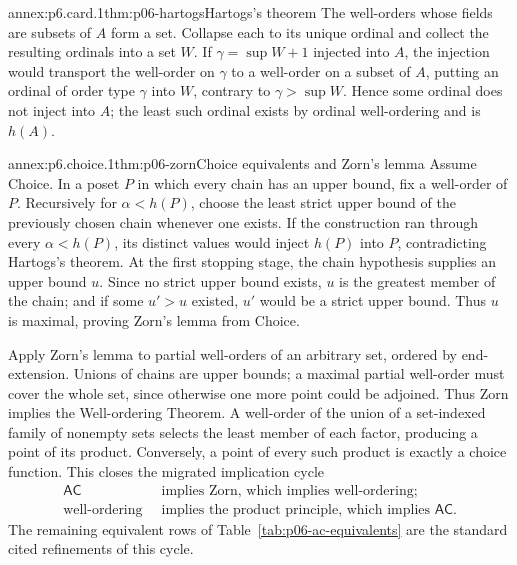 
\begin{annexitem}{annex:p6.card.1}{thm:p06-hartogs}{Hartogs's theorem}
The well-orders whose fields are subsets of \(A\) form a set.  Collapse each
to its unique ordinal and collect the resulting ordinals into a set \(W\).
If \(\gamma=\sup W+1\) injected into \(A\), the injection would transport the
well-order on \(\gamma\) to a well-order on a subset of \(A\), putting an
ordinal of order type \(\gamma\) into \(W\), contrary to
\(\gamma>\sup W\).  Hence some ordinal does not inject into \(A\); the least
such ordinal exists by ordinal well-ordering and is \(h(A)\).
\end{annexitem}

\begin{annexitem}{annex:p6.choice.1}{thm:p06-zorn}{Choice equivalents and Zorn's lemma}
Assume Choice.  In a poset \(P\) in which every chain has an upper bound, fix a
well-order of \(P\).  Recursively for \(\alpha<h(P)\), choose the least strict
upper bound of the previously chosen chain whenever one exists.  If the
construction ran through every \(\alpha<h(P)\), its distinct values would
inject \(h(P)\) into \(P\), contradicting Hartogs's theorem.  At the first
stopping stage, the chain hypothesis supplies an upper bound \(u\).  Since no
strict upper bound exists, \(u\) is the greatest member of the chain; and if
some \(u'>u\) existed, \(u'\) would be a strict upper bound.  Thus \(u\) is
maximal, proving Zorn's lemma from Choice.

Apply Zorn's lemma to partial well-orders of an arbitrary set, ordered by
end-extension.  Unions of chains are upper bounds; a maximal partial
well-order must cover the whole set, since otherwise one more point could be
adjoined.  Thus Zorn implies the Well-ordering Theorem.  A well-order of the
union of a set-indexed family of nonempty sets selects the least member of each
factor, producing a point of its product.  Conversely, a point of every such
product is exactly a choice function.  This closes the migrated implication
cycle
\[
  \begin{aligned}
    \mathsf{AC}&\ \text{ implies Zorn, which implies well-ordering;}\\
    \text{well-ordering}&\ \text{ implies the product principle, which implies }
      \mathsf{AC}.
  \end{aligned}
\]
The remaining equivalent rows of Table~\ref{tab:p06-ac-equivalents} are the
standard cited refinements of this cycle.
\end{annexitem}

